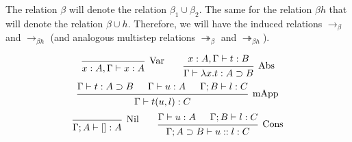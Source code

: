 \begin{notation}
  The relation $\beta$ will denote the relation $\beta_1 \cup \beta_2$.
  The same for the relation $\beta h$ that will denote the relation $\beta \cup h$.
  Therefore, we will have the induced relations $\to_\beta$ and $\to_{\beta h}$ (and analogous multistep relations $\twoheadrightarrow_\beta$ and $\twoheadrightarrow_{\beta h}$).
\end{notation}


\begin{comment}
\begin{definition}[$\beta h$-normal forms]
  We inductively define the sets of $\LamM$-terms and $\LamM$-lists in $\beta h$-normal form, respectively NF and NL, as follows:
  \[
    \begin{prooftree}
      \infer0{ x \in \text{NF} }
    \end{prooftree}
    \qquad
    \begin{prooftree}
      \hypo{ t \in \text{NF} }
      \infer1{ \lambda x . t \in \text{NF} } 
    \end{prooftree}
    \qquad
    \begin{prooftree}
      \hypo{ u \in \text{NF} } 
      \hypo{ l \in \text{NL} }
      \infer2{ x(u, l) \in \text{NF} }
    \end{prooftree}
    \qquad
    \begin{prooftree}
      \infer0{ [] \in \text{NL} } 
    \end{prooftree}
    \qquad
    \begin{prooftree}
      \hypo{ u \in \text{NF} }
      \hypo{ l \in \text{NL} }
      \infer2{ u::l \in \text{NL} }
    \end{prooftree}
  \]
\end{definition}
\end{comment}


\begin{definition}
  \[
    \begin{prooftree}
      \infer0[Var]{ x:A, \Gamma \vdash x:A } 
    \end{prooftree}
    \qquad
    \begin{prooftree}
      \hypo{ x:A, \Gamma \vdash t:B }
      \infer1[Abs]{ \Gamma \vdash \lambda x . t : A \supset B  } 
    \end{prooftree}
  \]
  \[
    \begin{prooftree}
      \hypo{ \Gamma \vdash t : A \supset B }
      \hypo{ \Gamma \vdash u : A }
      \hypo{ \Gamma ; B \vdash l : C }	
      \infer3[mApp]{ \Gamma \vdash t(u, l) : C } 
    \end{prooftree}
  \]
  \[
    \begin{prooftree}
      \infer0[Nil]{ \Gamma ; A \vdash []:A } 
    \end{prooftree}
    \qquad
    \begin{prooftree}
      \hypo{ \Gamma \vdash u:A }
      \hypo{ \Gamma ; B \vdash l:C }
      \infer2[Cons]{ \Gamma ; A \supset B \vdash  u::l : C } 
    \end{prooftree}
  \]
\end{definition}

